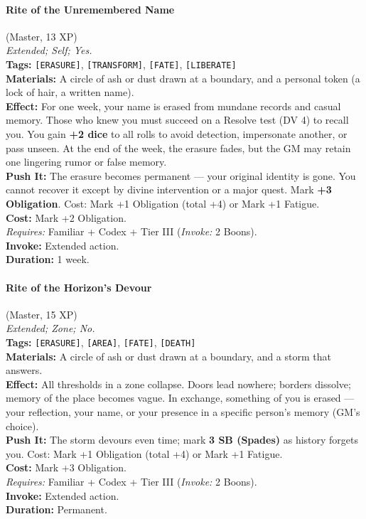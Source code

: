\paragraph{Rite of the Unremembered Name} (Master, 13 XP) \hfill \\
\emph{Extended; Self; Yes.} \\
\textbf{Tags:} \texttt{[ERASURE]}, \texttt{[TRANSFORM]}, \texttt{[FATE]}, \texttt{[LIBERATE]} \\
\textbf{Materials:} A circle of ash or dust drawn at a boundary, and a personal token (a lock of hair, a written name). \\
\textbf{Effect:} For one week, your name is erased from mundane records and casual memory. Those who knew you must succeed on a Resolve test (DV 4) to recall you. You gain \textbf{+2 dice} to all rolls to avoid detection, impersonate another, or pass unseen. At the end of the week, the erasure fades, but the GM may retain one lingering rumor or false memory. \\
\textbf{Push It:} The erasure becomes permanent --- your original identity is gone. You cannot recover it except by divine intervention or a major quest. Mark \textbf{+3 Obligation}. Cost: Mark +1 Obligation (total +4) or Mark +1 Fatigue. \\
\textbf{Cost:} Mark +2 Obligation. \\
\textit{Requires:} Familiar + Codex + Tier III (\textit{Invoke:} 2 Boons). \\
\textbf{Invoke:} Extended action. \\
\textbf{Duration:} 1 week.

\paragraph{Rite of the Horizon's Devour} (Master, 15 XP) \hfill \\
\emph{Extended; Zone; No.} \\
\textbf{Tags:} \texttt{[ERASURE]}, \texttt{[AREA]}, \texttt{[FATE]}, \texttt{[DEATH]} \\
\textbf{Materials:} A circle of ash or dust drawn at a boundary, and a storm that answers. \\
\textbf{Effect:} All thresholds in a zone collapse. Doors lead nowhere; borders dissolve; memory of the place becomes vague. In exchange, something of you is erased --- your reflection, your name, or your presence in a specific person's memory (GM's choice). \\
\textbf{Push It:} The storm devours even time; mark \textbf{3 SB (Spades)} as history forgets you. Cost: Mark +1 Obligation (total +4) or Mark +1 Fatigue. \\
\textbf{Cost:} Mark +3 Obligation. \\
\textit{Requires:} Familiar + Codex + Tier III (\textit{Invoke:} 2 Boons). \\
\textbf{Invoke:} Extended action. \\
\textbf{Duration:} Permanent.

